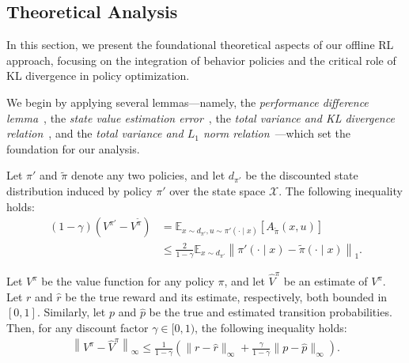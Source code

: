 \subsection{Theoretical Analysis}
\label{proofs}
In this section, we present the foundational theoretical aspects of our offline RL approach, focusing on the integration of behavior policies and the critical role of KL divergence in policy optimization. 

We begin by applying several lemmas—namely, the \emph{performance difference lemma}~\citep{agarwal2019reinforcement}, the \emph{state value estimation error}~\citep{lange2012batch}, the \emph{total variance and KL divergence relation}~\citep{csiszar2011information}, and the \emph{total variance and \(L_1\) norm relation}~\citep{IntroductiontoNonparametricEstimation}—which set the foundation for our analysis.


\begin{lemma}
\label{lemma1}
Let $\pi'$ and $\tilde{\pi}$ denote any two policies, and let $d_{\pi'}$ be the discounted state distribution induced by policy $\pi'$ over the state space $\mathcal{X}$. The following inequality holds:
\begin{equation}
\label{eq-lemma1}
\begin{aligned}
(1-\gamma)\left(V^{\pi'} - V^{\tilde{\pi}}\right) &= \mathbb{E}_{x \sim d_{\pi'}, u \sim \pi'(\cdot \mid x)}\left[A_{\tilde{\pi}}(x, u)\right] \\
&\leq \frac{2}{1-\gamma} \mathbb{E}_{x \sim d_{\pi'}}\left\|\pi'(\cdot \mid x) - \tilde{\pi}(\cdot \mid x)\right\|_1.
\end{aligned}
\end{equation}
\end{lemma}





\begin{lemma}
\label{lemma2}
Let $V^\pi$ be the value function for any policy $\pi$, and let $\hat{V}^\pi$ be an estimate of $V^\pi$. Let $r$ and $\hat{r}$ be the true reward and its estimate, respectively, both bounded in $[0,1]$. Similarly, let $p$ and $\hat{p}$ be the true and estimated transition probabilities. Then, for any discount factor $\gamma \in[0,1)$, the following inequality holds:
\begin{equation}
\label{eq-lemma2}
\begin{aligned}
\left\|V^\pi-\hat{V}^\pi\right\|_{\infty} \leq \frac{1}{1-\gamma}\left(\|r-\hat{r}\|_{\infty}+\frac{\gamma}{1-\gamma}\|p-\hat{p}\|_{\infty}\right).
\end{aligned}
\end{equation}
\end{lemma}




